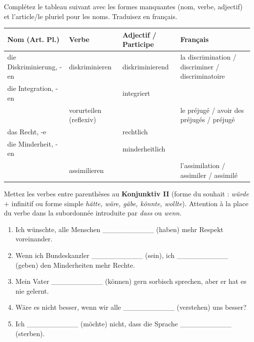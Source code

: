 \documentclass[11pt]{article}
\begin{document}
\begin{exercice}
Complétez le tableau suivant avec les formes manquantes (nom, verbe, adjectif) et l'article/le pluriel pour les noms. Traduisez en français.
\begin{center}
\begin{tabularx}{\linewidth}{|X|X|X|X|}
\hline
\rowcolor{popblueL} \textbf{Nom (Art. Pl.)} & \textbf{Verbe} & \textbf{Adjectif / Participe} & \textbf{Français} \\
\hline
die Diskriminierung, -en & diskriminieren & diskriminierend & la discrimination / discriminer / discriminatoire \\
\hline
die Integration, -en &  & integriert &  \\
\hline
 & vorurteilen (reflexiv) &  & le préjugé / avoir des préjugés / préjugé \\
\hline
das Recht, -e &  & rechtlich &  \\
\hline
die Minderheit, -en &  & minderheitlich &  \\
\hline
 & assimilieren &  & l'assimilation / assimiler / assimilé \\
\hline
\end{tabularx}
\end{center}
\end{exercice}

\begin{exercice}
Mettez les verbes entre parenthèses au \textbf{Konjunktiv II} (forme du souhait : \emph{würde} + infinitif ou forme simple \emph{hätte, wäre, gäbe, könnte, wollte}). Attention à la place du verbe dans la subordonnée introduite par \emph{dass} ou \emph{wenn}.
\begin{enumerate}
    \item Ich wünschte, alle Menschen \_\_\_\_\_\_\_\_\_\_ (haben) mehr Respekt voreinander.
    \item Wenn ich Bundeskanzler \_\_\_\_\_\_\_\_\_\_ (sein), ich \_\_\_\_\_\_\_\_\_\_ (geben) den Minderheiten mehr Rechte.
    \item Mein Vater \_\_\_\_\_\_\_\_\_\_ (können) gern sorbisch sprechen, aber er hat es nie gelernt.
    \item Wäre es nicht besser, wenn wir alle \_\_\_\_\_\_\_\_\_\_ (verstehen) uns besser?
    \item Ich \_\_\_\_\_\_\_\_\_\_ (möchte) nicht, dass die Sprache \_\_\_\_\_\_\_\_\_\_ (sterben).
\end{enumerate}
\end{exercice}
\end{document}
